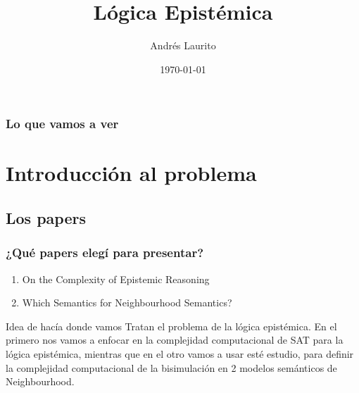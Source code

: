 \documentclass{beamer}
\title[L\'ogica Epist\'emica]{L\'ogica Epist\'emica} %
\author{Andr\'es Laurito} %
\institute[L\'ogicas Modales] %
{
Primer cuatrimestre 2016 \\ %
\medskip
\textit{andy.laurito@hotmail.com} %
}
\date{\today} %
\begin{document}
\begin{frame}
\titlepage %
\end{frame}

\begin{frame}
\frametitle{Lo que vamos a ver} %
\tableofcontents %
\end{frame}


\section{Introducci\'on al problema} 

\subsection{Los papers}

\begin{frame}
\frametitle{¿Qu\'e papers eleg\'i para presentar?}
\begin{enumerate}
\item On the Complexity of Epistemic Reasoning
\item Which Semantics for Neighbourhood Semantics?
\end{enumerate}

\begin{block}{Idea de hac\'ia donde vamos}
Tratan el problema de la l\'ogica epist\'emica. En el primero nos vamos a enfocar en la complejidad computacional de SAT para la l\'ogica epist\'emica, mientras que en el otro vamos a usar est\'e estudio, para definir la complejidad computacional de la bisimulaci\'on en 2 modelos sem\'anticos de Neighbourhood.
\end{block}


\end{frame}
\end{document}
